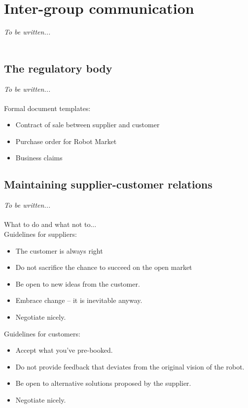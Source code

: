 \documentclass{scrreprt}
\begin{document}
\chapter{Inter-group communication}
\emph{To be written...}\\\\

\section{The regulatory body} \label{sec:regbody}
\emph{To be written...}\\\\
Formal document templates:

\begin{itemize}
\item Contract of sale between supplier and customer
\item Purchase order for Robot Market
\item Business claims
\end{itemize}

\section{Maintaining supplier-customer relations}
\emph{To be written...}\\\\
What to do and what not to...\\

Guidelines for suppliers:
\begin{itemize}
\item The customer is always right
\item Do not sacrifice the chance to succeed on the open market
\item Be open to new ideas from the customer.
\item Embrace change -- it is inevitable anyway.
\item Negotiate nicely.
\end{itemize}

Guidelines for customers:
\begin{itemize}
\item Accept what you've pre-booked.
\item Do not provide feedback that deviates from the original vision of the robot.
\item Be open to alternative solutions proposed by the supplier.
\item Negotiate nicely.
\end{itemize}
\end{document}
